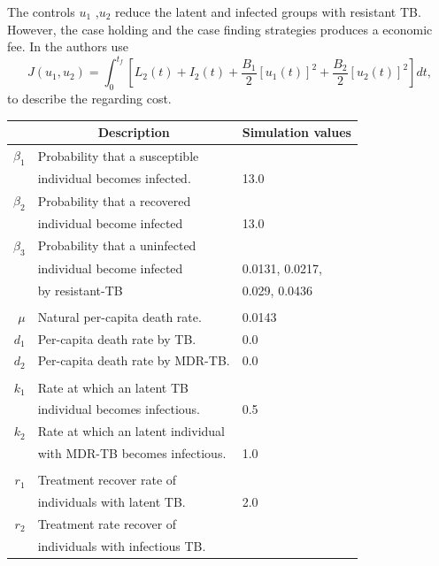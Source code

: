 	The controls $u_1$ ,$u_2$ reduce the latent and infected 
groups with resistant TB. However, the case holding and the case finding 
strategies produces a economic fee. In \cite{Lenhart2002} the authors use
\begin{equation}
	 J(u_1, u_2) =
		 \int_0 ^ {t_f}
			 \left[
				 L_2(t) + I_2(t) 
				 + \frac{B_1}{2} [u_1(t)] ^ 2
				 + \frac{B_2}{2} [u_2(t)] ^ 2
			 \right]dt,
\end{equation}
to describe the regarding cost.
\begin{table}[b]
	\centering
	\begin{tabular}{rll}
		\toprule
			& \multicolumn{1}{c}{\textbf{Description}} & \textbf{Simulation values}
            \\
        \midrule
        $\beta_1$ 
            & Probability that a susceptible 
            \\
            & individual becomes infected.
            & \num{13.0}            
            \\
        $\beta_2$ 
        	& Probability that a recovered 
        	\\
        	& individual  become infected
        	& \num{13.0}
        	\\
        $\beta_3$ 
        	& Probability that a uninfected 
        	\\
        	& individual become infected 
            & \num{0.0131}, 
              \num{0.0217},
            \\
            & by resistant-TB 
            & \num{0.029}, 
              \num{0.0436}
       		\\
     	\\
     	$\mu$ 
     	    & Natural per-capita death rate.
     	    & \num{0.0143}
			\\
     	$d_1$ 
     	    & Per-capita death rate by TB.
     	    & \num{0.0}
     	    \\
     	$d_2$ 
     	   	& Per-capita  death rate by MDR-TB.
     	   	& \num{0.0}
     	    \\
     	\\
     	$k_1$ 
     		& Rate at which an latent TB 
     		\\
     		& individual becomes infectious. 
     		& \num{0.5}
 			\\
     	    $k_2$  
     	    & Rate at which an latent individual
     	    \\
     	    & with MDR-TB becomes infectious.
     	    & \num{1.0}
		\\
		\\
		$r_1$ & 
      		Treatment recover rate of 
      		\\
      		& individuals with latent TB.
      		& \num{2.0}
     	    \\
		$r_2$ 
			& Treatment rate recover of 
			\\
			& individuals with infectious TB.
		

\end{tabular}
\end{table}
